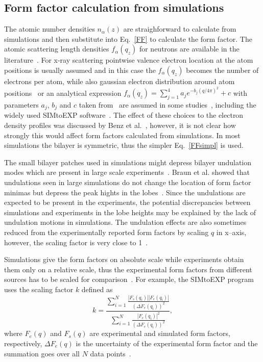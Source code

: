 \documentclass[aps,prl,superscriptaddress,twocolumn]{revtex4}
\begin{document}
\subsection{Form factor calculation from simulations}
The atomic number densities $n_\alpha(z)$ are straighforward to calculate from simulations and
then substitute into Eq.~\ref{FF} to calculate the form factor. The atomic scattering 
length densities $f_\alpha(q_z)$ for neutrons are available in the literature~\cite{sears92}.
For x-ray scattering pointwise valence electron location at the atom positions is usually assumed 
and in this case the $f_\alpha(q_z)$ becomes the number of electrons per atom,
while also gaussian electron distribution around atom positions~\cite{benz05} or an analytical expression 
$f_\alpha(q_z)=\sum_{j=1}^4a_je^{-b_j(q/4\pi)^2}+c$ with parameters $a_j$, $b_j$ and $c$ taken from~\cite{cromer68}  
are assumed in some studies~\cite{benz05}, including the widely used SIMtoEXP software~\cite{kucerka10}.
The effect of these choices to the electron density profiles was discussed by Benz et al.~\cite{benz05}, 
however, it is not clear how strongly this would affect form factors calculated from simulations.
In most simulations the bilayer is symmetric, thus the simpler Eq.~\ref{FFsimpl} is used. 

The small bilayer patches used in simulations might depress bilayer undulation modes which are present in large 
scale experiments~\cite{braun11}. Braun et al. showed that undulations seen in large simulations do
not change the location of form factor minimas but depress the peak hights in the lobes~\cite{braun11}.
Since the undulations are expected to be present in the experiments, the potential discrepancies 
between simulations and experiments in the lobe heights may be explained by the lack of undulation 
motions in simulations. The undulation effects are also sometimes reduced from the experimentally 
reported form factors by scaling $q$ in x--axis, however, the scaling factor is very close to 1~\cite{kucerka05a}.

Simulations give the form factors on absolute scale while experiments obtain them only on a relative scale,
thus the experimental form factors from different sources has to be scaled for comparison~\cite{kucerka08a,kucerka10}.
For example, the SIMtoEXP program uses the scaling factor $k$ defined as 
\begin{equation}
k=\frac{\sum_{i=1}^N\frac{|F_s(q_i)||F_e(q_i)|}{(\Delta F_e(q_i))^2}}{\sum_{i=1}^N\frac{|F_e(q_i)|^2}{(\Delta F_e(q_i))^2}},
\end{equation} 
where $F_e(q)$ and $F_s(q)$ are experimental and simulated form factors, respectively, $\Delta F_e(q)$ is the uncertainty
of the experimental form factor and the summation goes over all $N$ data points~\cite{kucerka08a,kucerka10}.
\end{document}
